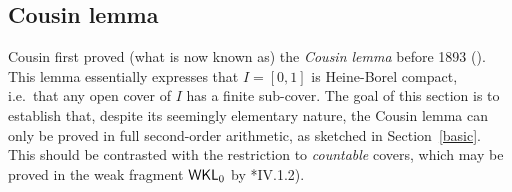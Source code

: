 \documentclass[reqno]{amsart}
\def\WKL{\textup{\textsf{WKL}}}
\numberwithin{equation}{section}
\numberwithin{thm}{section}
\begin{document}
\subsection{Cousin lemma}\label{CL}
Cousin first proved (what is now known as) the \emph{Cousin lemma} before 1893 (\cite{dugac1}).  
This lemma essentially expresses that $I=[0,1]$ is Heine-Borel compact, i.e.\ that any open cover of $I$ has a finite sub-cover.  
The goal of this section is to establish that, despite its seemingly elementary nature, the Cousin lemma can only be proved in full second-order arithmetic, as sketched in Section~\ref{basic}.  
This should be contrasted with the restriction to \emph{countable} covers, which may be proved in the weak fragment $\WKL_{0}$ by \cite{simpson2}*{IV.1.2}).

\smallskip
\end{document}
